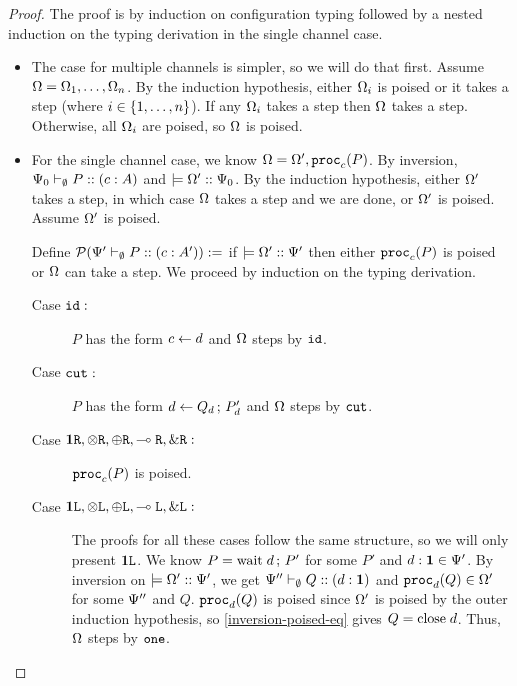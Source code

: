 \begin{proof}
The proof is by induction on configuration typing followed by a nested induction on the typing derivation in the single channel case.

\begin{itemize}
  \item The case for multiple channels is simpler, so we will do that first. Assume $\Omega = \Omega_1, \ldots, \Omega_n$. By the induction hypothesis, either $\Omega_i$ is poised or it takes a step (where $i \in \lbrace1, \ldots, n\rbrace$). If any $\Omega_i$ takes a step then $\Omega$ takes a step. Otherwise, all $\Omega_i$ are poised, so $\Omega$ is poised.

  \item For the single channel case, we know $\Omega = \Omega', \mathtt{proc}_{c}(P)$. By inversion, ${\Psi_0} \vdash_{\emptyset} P :: (c : A)$ and $\models {\Omega'} :: {\Psi_0}$. By the induction hypothesis, either $\Omega'$ takes a step, in which case $\Omega$ takes a step and we are done, or $\Omega'$ is poised. Assume $\Omega'$ is poised.

  Define $\pred{\typeRecD{\ctx'}{\emptyset}{P}{c}{A'}} :=$ if $\models {\Omega'} :: {\Psi'}$ then either $\mathtt{proc}_{c}(P)$ is poised or $\Omega$ can take a step. We proceed by induction on the typing derivation.
    \begin{description}
      \item[Case $\texttt{id}:$] $P$ has the form $c \leftarrow d$ and $\Omega$ steps by $\texttt{id}$.
      \item[Case $\texttt{cut}:$] $P$ has the form $d \leftarrow Q_d \,;\, P'_d$ and $\Omega$ steps by $\texttt{cut}$.

      \item[Case $\mathbf{1}\texttt{R}, \otimes\texttt{R}, \oplus\texttt{R}, \multimap\texttt{R}, \&\texttt{R} :$] $\mathtt{proc}_{c}(P)$ is poised.

      \item[Case $\mathbf{1}\texttt{L}, \otimes\texttt{L}, \oplus\texttt{L}, \multimap\texttt{L}, \&\texttt{L} :$] The proofs for all these cases follow the same structure, so we will only present $\mathbf{1}\texttt{L}$. We know $P = \mathrm{wait}\;d \,;\, P'$ for some $P'$ and $d : \mathbf{1} \in \Psi'$. By inversion on $\models {\Omega'} :: {\Psi'}$, we get ${\Psi''} \vdash_{\emptyset} Q :: (d : \mathbf{1})$ and $\mathtt{proc}_{d}(Q) \in \Omega'$ for some $\Psi''$ and $Q$. $\mathtt{proc}_{d}(Q)$ is poised since $\Omega'$ is poised by the outer induction hypothesis, so \cref{inversion-poised-eq} gives $Q = \mathrm{close}\;d$. Thus, $\Omega$ steps by $\texttt{one}$.


\end{description}
\end{itemize}
\end{proof}
